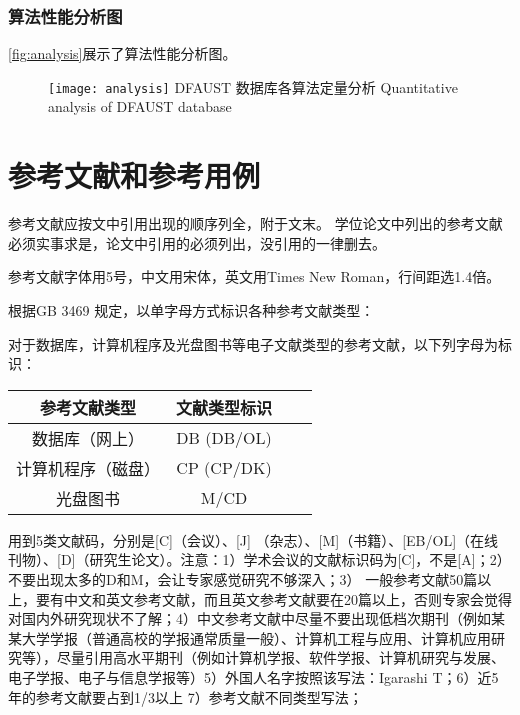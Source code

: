 \documentclass[12pt]{zjutthesis}
\begin{document}
\subsection{算法性能分析图}
\autoref{fig:analysis}展示了算法性能分析图。

\begin{figure}[!htp]
  \centering
  \texttt{[image: analysis]}
  \bicaption
    {DFAUST 数据库各算法定量分析}
    {Quantitative analysis of DFAUST database}
  \label{fig:analysis}
\end{figure}

\chapter{参考文献和参考用例}

参考文献应按文中引用出现的顺序列全，附于文末。
学位论文中列出的参考文献必须实事求是，论文中引用的必须列出，没引用的一律删去。

参考文献字体用5号，中文用宋体，英文用Times New Roman，行间距选1.4倍。

根据GB 3469 规定，以单字母方式标识各种参考文献类型：

\begin{table}[htp]
  \centering
\end{table}

对于数据库，计算机程序及光盘图书等电子文献类型的参考文献，以下列字母为标识：
\begin{table}[htp]
  \centering
  \begin{tabular}{cccc}
    \toprule
    \textbf{参考文献类型} & \textbf{文献类型标识} \\
    \midrule
    数据库（网上）         & DB (DB/OL)      \\
    计算机程序（磁盘）       & CP (CP/DK)      \\
    光盘图书            & M/CD            \\
    \bottomrule
  \end{tabular}
\end{table}

用到5类文献码，分别是[C]（会议）、[J] （杂志）、[M]（书籍）、[EB/OL]（在线刊物）、[D]（研究生论文）。注意：1）学术会议的文献标识码为[C]，不是[A]；2）不要出现太多的D和M，会让专家感觉研究不够深入；3） 一般参考文献50篇以上，要有中文和英文参考文献，而且英文参考文献要在20篇以上，否则专家会觉得对国内外研究现状不了解；4）中文参考文献中尽量不要出现低档次期刊（例如某某大学学报（普通高校的学报通常质量一般）、计算机工程与应用、计算机应用研究等），尽量引用高水平期刊（例如计算机学报、软件学报、计算机研究与发展、电子学报、电子与信息学报等）5）外国人名字按照该写法：Igarashi T；6）近5年的参考文献要占到1/3以上 7）参考文献不同类型写法；
\end{document}
